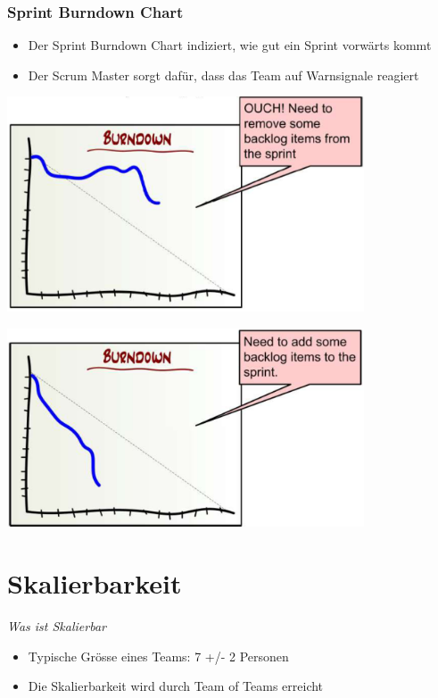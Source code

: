 \documentclass{report}
\newenvironment{Figure}
	{\par\medskip\noindent\minipage{\linewidth}}
	{\endminipage\par\medskip}
\theoremstyle{definition}
\theoremstyle{example}
\begin{document}
\subsubsection{Sprint Burndown Chart}
\begin{itemize}
	\item Der Sprint Burndown Chart indiziert, wie gut ein Sprint vorwärts kommt
	\item Der Scrum Master sorgt dafür, dass das Team auf Warnsignale reagiert
\end{itemize}
\begin{Figure}
\centering
\includegraphics[width=400px]{img/Warnsignal1.png}
	\label{fig:Burndown Chart Warnsignal 1}
\end{Figure}

\begin{Figure}
\centering
\includegraphics[width=400px]{img/Warnsignal2.png}
	\label{fig:Burndown Chart Warnsignal 2}
\end{Figure}

\section{Skalierbarkeit}
\textit{Was ist Skalierbar}
\begin{itemize}
	\item Typische Grösse eines Teams: 7 +/- 2 Personen
	\item Die Skalierbarkeit wird durch Team of Teams erreicht
\end{itemize}
\end{document}
